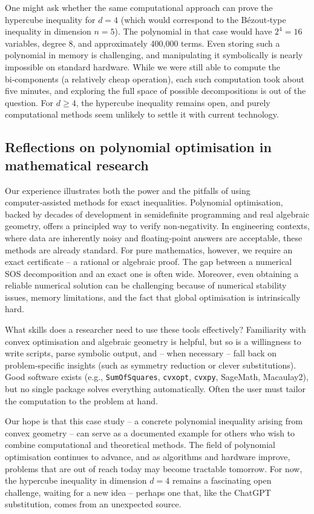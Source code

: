 \documentclass[11pt]{amsart}
\theoremstyle{definition}
\theoremstyle{remark}
\begin{document}
One might ask whether the same computational approach can prove the hypercube inequality for $d=4$ (which would correspond to the Bézout‑type inequality in dimension $n=5$). The polynomial in that case would have $2^4 = 16$ variables, degree $8$, and approximately 400,000 terms. Even storing such a polynomial in memory is challenging, and manipulating it symbolically is nearly impossible on standard hardware. While we were still able to compute the bi‑components (a relatively cheap operation), each such computation took about five minutes, and exploring the full space of possible decompositions is out of the question. For $d\ge 4$, the hypercube inequality remains open, and purely computational methods seem unlikely to settle it with current technology.

\subsection{Reflections on polynomial optimisation in mathematical research}

Our experience illustrates both the power and the pitfalls of using computer‑assisted methods for exact inequalities. Polynomial optimisation, backed by decades of development in semidefinite programming and real algebraic geometry, offers a principled way to verify non‑negativity. In engineering contexts, where data are inherently noisy and floating‑point answers are acceptable, these methods are already standard. For pure mathematics, however, we require an exact certificate – a rational or algebraic proof. The gap between a numerical SOS decomposition and an exact one is often wide. Moreover, even obtaining a reliable numerical solution can be challenging because of numerical stability issues, memory limitations, and the fact that global optimisation is intrinsically hard.

What skills does a researcher need to use these tools effectively? Familiarity with convex optimisation and algebraic geometry is helpful, but so is a willingness to write scripts, parse symbolic output, and – when necessary – fall back on problem‑specific insights (such as symmetry reduction or clever substitutions). Good software exists (e.g., \texttt{SumOfSquares}, \texttt{cvxopt}, \texttt{cvxpy}, SageMath, Macaulay2), but no single package solves everything automatically. Often the user must tailor the computation to the problem at hand.

Our hope is that this case study – a concrete polynomial inequality arising from 
convex geometry – can serve as a documented example for others who wish to combine computational and theoretical methods. The field of polynomial optimisation continues to advance, and as algorithms and hardware improve, problems that are out of reach today may become tractable tomorrow. For now, the hypercube inequality in dimension $d=4$ remains a fascinating open challenge, waiting for a new idea – perhaps one that, like the ChatGPT substitution, comes from an unexpected source.
\end{document}

